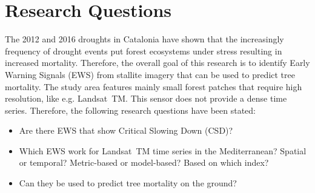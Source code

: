 \section{Research Questions}\label{sec:rq}
The 2012 and 2016 droughts in Catalonia have shown that the increasingly frequency of drought events put forest ecosystems under stress resulting in increased mortality. Therefore, the overall goal of this research is to identify Early Warning Signals (EWS) from stallite imagery that can be used to predict tree mortality. The study area features mainly small forest patches that require high resolution, like e.g. Landsat~TM. This sensor does not provide a dense time series. Therefore, the following research questions have been stated:

\begin{itemize}
\item Are there EWS that show Critical Slowing Down (CSD)?
\item Which EWS work for Landsat~TM time series in the Mediterranean? Spatial or temporal? Metric-based or model-based? Based on which index?
\item Can they be used to predict tree mortality on the ground?
\end{itemize}

\bigskip
\bigskip


